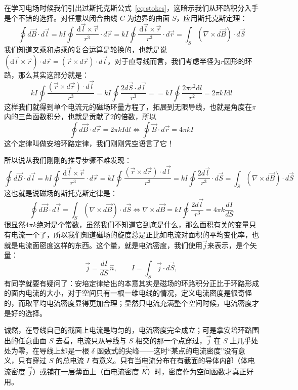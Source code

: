 \documentclass[UTF8]{ctexbook}
\begin{document}
在学习电场时候我们引出过斯托克斯公式~\eqref{eq:stokes}，这暗示我们从环路积分入手是个不错的选择。对任意以闭合曲线 \(C\) 为边界的曲面 \(S\)，应用斯托克斯定理：
\[
\oint d\vec{B}\cdot d\vec{l}
=kI\oint \frac{\,\mathrm{d}\vec{l}\times\vec{r}}{r^3}\cdot d\vec{r}
=kI\oint \frac{\,\mathrm{d}\vec{l}\times\vec{r}}{r^3}\cdot d\vec{r}
=\int_S (\nabla\times d\vec{B})\cdot d\vec{S}
\]
我们知道叉乘和点乘的复合运算是轮换的，也就是说$(\mathrm{d}\vec{l}\times\vec{r})\cdot d\vec{r}=(\vec{r}\times d\vec{r})\cdot d\vec{l}$，对于直导线而言，我们考虑半径为$r$圆形的环路，那么其实这部分就是：
\[
kI\oint \frac{(\vec{r}\times d\vec{r})\cdot d\vec{l}}{r^3}=
kI\oint \frac{2d\vec{S}\cdot d\vec{l}}{r^3}
=
=kI\oint \frac{2\pi r^2 \mathrm{d}{l}}{r^2}
=2\pi kI\mathrm{d}{l}
\]
这样我们就得到单个电流元的磁场环量方程了，拓展到无限导线，也就是角度在$\pi$内的三角函数积分，也就是贡献了$2$的倍数，所以
\[
\oint d\vec{B}\cdot d\vec{r}=2\pi kI\mathrm{d}{l} \Longleftrightarrow \oint \vec{B}\cdot d\vec{r}=4\pi kI
\]
这个定律叫做安培环路定律，我们刚刚凭空语言了它！

所以说从我们刚刚的推导步骤不难发现：
\[
\oint d\vec{B}\cdot d\vec{l}
=kI\oint \frac{\,\mathrm{d}\vec{l}\times\vec{r}}{r^3}\cdot d\vec{r}
=kI\oint \frac{(\vec{r}\times d\vec{r})\cdot d\vec{l}}{r^3}
=kI\oint \frac{2 d\vec{l}}{r^3}\cdot d\vec{S}
=\int_S (\nabla\times d\vec{B})\cdot d\vec{S}
\]
这也就是说磁场的斯托克斯定律是：
\[
\oint d\vec{B}\cdot d\vec{l}
=\int_S (\nabla\times d\vec{B})\cdot d\vec{S}
\Longleftrightarrow
\nabla \times d\vec{B} = kI\oint \frac{2 d\vec{l}}{r^3} = 4\pi k\frac{dI}{dS}
\]
很显然$4\pi k$绝对是个常数，虽然我们不知道它到底是什么，那么面积有关的变量只有电流一个了，所以我们知道磁场的旋度总是正比如电流对面积的平均变化率，也就是电流面密度这样的东西。这个量，就是电流密度，我们使用$\vec j$来表示，是个矢量：
\[
\vec j=\frac{dI}{dS}\,\hat{ n},
\qquad
I=\int_S \vec j\cdot d\vec S,
\]
有同学就要有疑问了：安培定律给出的本意其实是磁场的环路积分正比于环路形成的面内电流的大小，对于空间只有一根一维电线的情况，定义电流密度是很奇怪的，而取平均电流密度显得更加合理；显然只电流充满整个空间时候，电流密度才是好的选择。

诚然，在导线自己的截面上电流是均匀的，电流密度完全成立；可是拿安培环路围出的任意曲面 \(S\) 去看，电流只从导线与 \(S\) 相交的那一个点穿过，\(\vec j\) 在 \(S\) 上几乎处处为零，在导线上却是一根 \(\delta\) 函数式的尖峰——这时“某点的电流密度”没有意义，只有穿过 \(S\) 的总电流 \(I\) 有意义。只有当电流分布在有截面的导体内部（体电流密度 \(\vec j\)）或铺在一层薄面上（面电流密度 \(\vec K\)）时，密度作为空间函数才真正好用。
\end{document}
